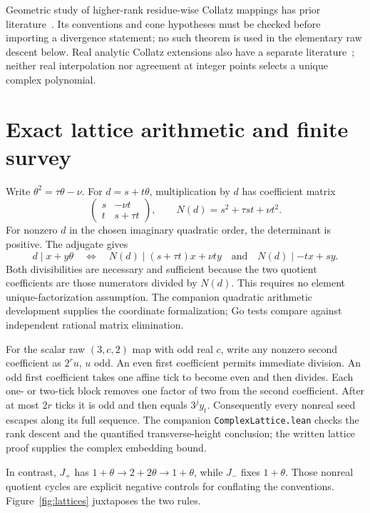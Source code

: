 \documentclass[11pt,letterpaper]{article}
\begin{document}
Geometric study of higher-rank residue-wise Collatz mappings has prior literature~\cite{Kionke17}. Its conventions and cone hypotheses must be checked before importing a divergence statement; no such theorem is used in the elementary raw descent below. Real analytic Collatz extensions also have a separate literature~\cite{Chamberland96}; neither real interpolation nor agreement at integer points selects a unique complex polynomial.

\section{Exact lattice arithmetic and finite survey}

Write \(\theta^2=\tau\theta-\nu\). For \(d=s+t\theta\), multiplication by \(d\) has coefficient matrix
\[
\begin{pmatrix}s&-\nu t\\t&s+\tau t\end{pmatrix},
\qquad N(d)=s^2+\tau st+\nu t^2.
\]
For nonzero \(d\) in the chosen imaginary quadratic order, the determinant is positive. The adjugate gives
\[
d\mid x+y\theta
\quad\Longleftrightarrow\quad
N(d)\mid(s+\tau t)x+\nu ty
\quad\text{and}\quad N(d)\mid-tx+sy.
\]
Both divisibilities are necessary and sufficient because the two quotient coefficients are those numerators divided by \(N(d)\). This requires no element unique-factorization assumption. The companion quadratic arithmetic development supplies the coordinate formalization; Go tests compare against independent rational matrix elimination.

For the scalar raw \((3,c,2)\) map with odd real \(c\), write any nonzero second coefficient as \(2^r u\), \(u\) odd. An even first coefficient permits immediate division. An odd first coefficient takes one affine tick to become even and then divides. Each one- or two-tick block removes one factor of two from the second coefficient. After at most \(2r\) ticks it is odd and then equals \(3^j y_t\). Consequently every nonreal seed escapes along its full sequence. The companion \texttt{ComplexLattice.lean} checks the rank descent and the quantified transverse-height conclusion; the written lattice proof supplies the complex embedding bound.

In contrast, \(J_+\) has \(1+\theta\to2+2\theta\to1+\theta\), while \(J_-\) fixes \(1+\theta\). Those nonreal quotient cycles are explicit negative controls for conflating the conventions. Figure~\ref{fig:lattices} juxtaposes the two rules.
\end{document}
